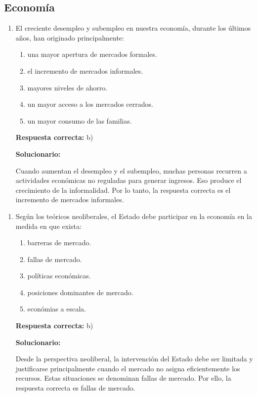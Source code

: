 \subsection*{Economía}

\begin{enumerate}
	
	\item El creciente desempleo y subempleo en nuestra economía, durante los últimos años, han originado principalmente:
	
	\begin{enumerate}[label=\alph*)]
		\item una mayor apertura de mercados formales.
		\item el incremento de mercados informales.
		\item mayores niveles de ahorro.
		\item un mayor acceso a los mercados cerrados.
		\item un mayor consumo de las familias.
	\end{enumerate}
	
	\textbf{Respuesta correcta:} b)
	
	\vspace{2mm}
	\textbf{Solucionario:}
	
	Cuando aumentan el desempleo y el subempleo, muchas personas recurren a actividades económicas no reguladas para generar ingresos. Eso produce el crecimiento de la informalidad. Por lo tanto, la respuesta correcta es el incremento de mercados informales.
	
\end{enumerate}

\begin{enumerate}[resume]
	
	\item Según los teóricos neoliberales, el Estado debe participar en la economía en la medida en que exista:
	
	\begin{enumerate}[label=\alph*)]
		\item barreras de mercado.
		\item fallas de mercado.
		\item políticas económicas.
		\item posiciones dominantes de mercado.
		\item económias a escala.
	\end{enumerate}
	
	\textbf{Respuesta correcta:} b)
	
	\vspace{2mm}
	\textbf{Solucionario:}
	
	Desde la perspectiva neoliberal, la intervención del Estado debe ser limitada y justificarse principalmente cuando el mercado no asigna eficientemente los recursos. Estas situaciones se denominan fallas de mercado. Por ello, la respuesta correcta es fallas de mercado.
	
\end{enumerate}




